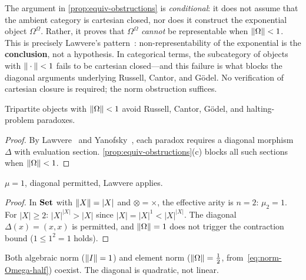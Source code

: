 \begin{remark}%
\label{rmk:exponential-objects}
The argument in \cref{prop:equiv-obstructions} is
\emph{conditional}: it does not assume that the ambient category is
cartesian closed, nor does it construct the exponential object
$\Omega^\Omega$.  Rather, it proves that $\Omega^\Omega$ \emph{cannot}
be representable when $\|\Omega\|<1$.  This is precisely Lawvere's
pattern~\cite{lawvere69}: non-representability of the exponential is the
\textbf{conclusion}, not a hypothesis.  In categorical terms, the
subcategory of objects with $\|\cdot\|<1$ fails to be cartesian
closed---and this failure is what blocks the diagonal arguments underlying
Russell, Cantor, and G\"odel.  No verification of cartesian closure is
required; the norm obstruction suffices.
\end{remark}

\begin{corollary}\label{cor:paradox-avoidance}
Tripartite objects with $\|\Omega\|<1$ avoid Russell, Cantor,
G\"odel, and halting-problem paradoxes.
\end{corollary}

\begin{proof}
By Lawvere~\cite{lawvere69} and Yanofsky~\cite{yanofsky03}, each paradox
requires a diagonal morphism $\Delta$ with evaluation section.
\cref{prop:equiv-obstructions}(c) blocks all such sections when
$\|\Omega\|<1$.
\end{proof}


\begin{proposition}\label{prop:set-level}
$\mu=1$, diagonal permitted, Lawvere applies.
\end{proposition}

\begin{proof}
In $\mathbf{Set}$ with $\|X\|=|X|$ and $\otimes=\times$, the effective arity is
$n=2$: $\mu_2=1$.  For $|X|\ge 2$: $|X|^{|X|}>|X|$ since
$|X|=|X|^1<|X|^{|X|}$.  The diagonal $\Delta(x)=(x,x)$ is permitted, and
$\|\Omega\|=1$ does not trigger the contraction bound
($1\le 1^2 = 1$ holds).
\end{proof}

\begin{proposition}\label{prop:hilb-level}
Both algebraic norm ($\|I\|=1$) and element norm
($\|\Omega\|=\tfrac{1}{2}$, from~\cref{eq:norm-Omega-half}) coexist.
The diagonal is quadratic, not linear.
\end{proposition}

